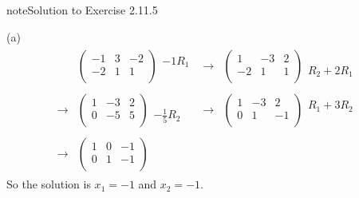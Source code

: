 \documentclass[letterpaper,10pt,english]{jupyterBook}
\begin{document}
\begin{sphinxadmonition}{note}{Solution to Exercise 2.11.5}



\sphinxAtStartPar
(a)
\begin{equation*}
\begin{split} \begin{align*} 
    & \left( \begin{array}{cc|c} 
         -1 & 3 & -2 \\ 
         -2 & 1 & 1 \\ 
    \end{array} \right) 
    \begin{array}{l} -1 R_{1}\\ \phantom{x} \end{array} & 
    \longrightarrow 
    & \left( \begin{array}{cc|c} 
         1 & -3 & 2 \\ 
         -2 & 1 & 1 \\ 
    \end{array} \right) 
    \begin{array}{l} \phantom{x} \\ R_{2} + 2 R_{1}\end{array} \\ \\ 
    \longrightarrow 
    & \left( \begin{array}{cc|c} 
         1 & -3 & 2 \\ 
         0 & -5 & 5 \\ 
    \end{array} \right) 
    \begin{array}{l} \phantom{x} \\ - \frac{1}{5} R_{2}\end{array} & 
    \longrightarrow 
    & \left( \begin{array}{cc|c} 
         1 & -3 & 2 \\ 
         0 & 1 & -1 \\ 
    \end{array} \right) 
    \begin{array}{l} R_{1} + 3 R_{2}\\ \phantom{x} \end{array} \\ \\ 
    \longrightarrow 
    & \left( \begin{array}{cc|c} 
         1 & 0 & -1 \\ 
         0 & 1 & -1 \\ 
    \end{array} \right) 
\end{align*} \end{split}
\end{equation*}
\sphinxAtStartPar
So the solution is \(x_{1} = -1\) and \(x_{2} = -1\).


\end{sphinxadmonition}
\end{document}
